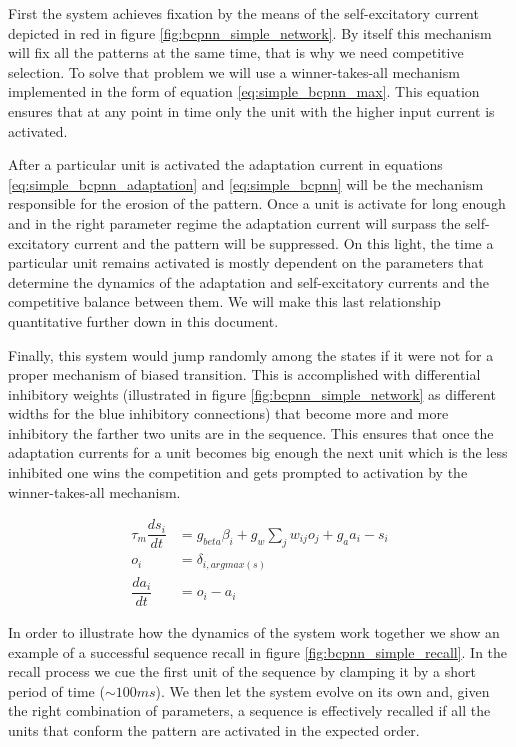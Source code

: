 \documentclass[10pt,a4paper]{article}
\begin{document}
First the system achieves fixation by the means of the self-excitatory current depicted in red in figure \ref{fig:bcpnn_simple_network}. By itself this mechanism will fix all the patterns at the same time, that is why we need competitive selection.  To solve that problem we will use a winner-takes-all mechanism \cite{yuille1998winner} implemented in the form of equation \ref{eq:simple_bcpnn_max}. This equation ensures that at any point in time only the unit with the higher input current is activated. 


After a particular unit is activated the adaptation current in equations \ref{eq:simple_bcpnn_adaptation} and \ref{eq:simple_bcpnn}  will be the mechanism responsible for the erosion of the pattern. Once a unit is activate for long enough and in the right parameter regime the adaptation current will surpass the self-excitatory current and the pattern will be suppressed. On this light, the time a particular unit remains activated is mostly dependent on the parameters that determine the dynamics of the adaptation and self-excitatory currents and the competitive balance between them. We will make this last relationship quantitative further down in this document. 

Finally, this system would jump randomly among the states if it were not for a proper mechanism of biased transition. This is accomplished with differential inhibitory weights (illustrated in figure \ref{fig:bcpnn_simple_network} as different widths for the blue inhibitory connections) that become more and more inhibitory the farther two units are in the sequence. This ensures that once the adaptation currents for a unit becomes big enough the next unit which is the less inhibited one wins the competition and gets prompted to activation by the winner-takes-all mechanism.  

\begin{align}
\tau_m \dfrac{ds_i}{dt} &= g_{beta}\beta_i + g_{w}\sum_{j} w_{ij} o_j + g_a a_i - s_i \label{eq:simple_bcpnn} \\ 
o_i &=  \delta_{i, argmax(s)} \label{eq:simple_bcpnn_max} \\ 
\dfrac{da_i}{dt} &= o_i - a_i \label{eq:simple_bcpnn_adaptation}
\end{align}

In order to illustrate how the dynamics of the system work together we show an example of a successful sequence recall in figure \ref{fig:bcpnn_simple_recall}. In the recall process we cue the first unit of the sequence by clamping it by a short period of time ($\sim 100ms$). We then let the system evolve on its own and, given the right combination of parameters, a sequence is effectively recalled if all the units that conform the pattern are activated in the expected order. 
\end{document}
